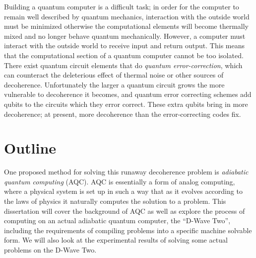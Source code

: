 Building a quantum computer is a difficult task;\cite{qc}\cite{qcbook} in order for the computer to remain well described by quantum mechanics, interaction with the outside world must be minimized otherwise the computational elements will become thermally mixed and no longer behave quantum mechanically.  However, a computer must interact with the outside world to receive input and return output.  This means that the computational section of a quantum computer cannot be too isolated.  There exist quantum circuit elements that do \emph{quantum error-correction},\cite{shor_error} which can counteract the deleterious effect of thermal noise or other sources of decoherence.  Unfortunately the larger a quantum circuit grows the more vulnerable to decoherence it becomes, and quantum error correcting schemes add qubits to the circuits which they error correct.  These extra qubits bring in more decoherence; at present, more decoherence than the error-correcting codes fix.\cite{qcbook}

\section{Outline}
One proposed method for solving this runaway decoherence problem is \emph{adiabatic quantum computing} (AQC).\cite{farhi}  AQC is essentially a form of analog computing, where a physical system is set up in such a way that as it evolves according to the laws of physics it naturally computes the solution to a problem.  This dissertation will cover the background of AQC as well as explore the process of computing on an actual adiabatic quantum computer, the ``D-Wave Two'', including the requirements of compiling problems into a specific machine solvable form.  We will also look at the experimental results of solving some actual problems on the D-Wave Two.
